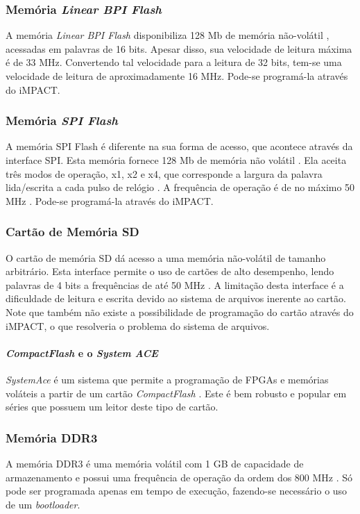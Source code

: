 \documentclass[11pt,a4paper,oneside]{book}
\begin{document}
\subsubsection{Memória \textit{Linear BPI Flash}}
A memória \textit{Linear BPI Flash} disponibiliza 128 Mb de memória não-volátil \cite{ug810}, acessadas em palavras de 16 bits.
Apesar disso, sua velocidade de leitura máxima é de 33 MHz.
Convertendo tal velocidade para a leitura de 32 bits, tem-se uma velocidade de leitura de aproximadamente 16 MHz.
Pode-se programá-la através do iMPACT.

\subsubsection{Memória \textit{SPI Flash}}
A memória SPI Flash é diferente na sua forma de acesso, que acontece através da interface SPI.
Esta memória fornece 128 Mb de memória não volátil \cite{ug810}.
Ela aceita três modos de operação, x1, x2 e x4, que corresponde a largura da palavra lida/escrita a cada pulso de relógio \cite{N25Q128}.
A frequência de operação é de no máximo 50 MHz \cite{xapp586}.
Pode-se programá-la através do iMPACT.

\subsubsection{Cartão de Memória SD}
O cartão de memória SD dá acesso a uma memória não-volátil de tamanho arbitrário.
Esta interface permite o uso de cartões de alto desempenho, lendo palavras de 4 bits a frequências de até 50 MHz \cite{ug810}.
A limitação desta interface é a dificuldade de leitura e escrita devido ao sistema de arquivos inerente ao cartão.
Note que também não existe a possibilidade de programação do cartão através do iMPACT, o que resolveria o problema do sistema de arquivos.

\paragraph{\textit{CompactFlash} e o \textit{System ACE}}
\textit{SystemAce} é um sistema que permite a programação de FPGAs e memórias voláteis a partir de um cartão \textit{CompactFlash} \cite{ds080, ds583}.
Este é bem robusto e popular em séries que possuem um leitor deste tipo de cartão.

\subsubsection{Memória DDR3}
A memória DDR3 é uma memória volátil com 1 GB de capacidade de armazenamento e possui uma frequência de operação da ordem dos 800 MHz \cite{MT8JTF12864HZ}.
Só pode ser programada apenas em tempo de execução, fazendo-se necessário o uso de um \textit{bootloader}.
\end{document}
